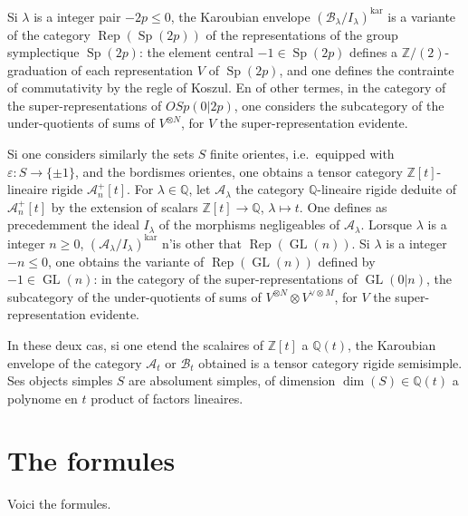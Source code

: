 \documentclass[11pt,a4paper]{article}
\DeclareMathOperator{\Rep}{Rep}
\DeclareMathOperator{\GL}{GL}
\DeclareMathOperator{\Sp}{Sp}
\newcommand{\Q}{\mathbb{Q}}
\newcommand{\Z}{\mathbb{Z}}
\begin{document}
Si $\lambda$ is a integer pair $-2p \leq 0$, the Karoubian envelope $(\mathcal{B}_\lambda/I_\lambda)^{\text{kar}}$ is a variante of the category $\Rep(\Sp(2p))$ of the representations of the group symplectique $\Sp(2p)$: the element central $-1 \in \Sp(2p)$ defines a $\Z/(2)$-graduation of each representation $V$ of $\Sp(2p)$, and one defines the contrainte of commutativity by the regle of Koszul. En of other termes, in the category of the super-representations of $OSp(0|2p)$, one considers the subcategory of the under-quotients of sums of $V^{\otimes N}$, for $V$ the super-representation evidente.

Si one considers similarly the sets $S$ finite orientes, i.e.~equipped with $\varepsilon: S \to \{\pm 1\}$, and the bordismes orientes, one obtains a tensor category $\Z[t]$-lineaire rigide $\mathcal{A}_n^+[t]$. For $\lambda \in \Q$, let $\mathcal{A}_\lambda$ the category $\Q$-lineaire rigide deduite of $\mathcal{A}_n^+[t]$ by the extension of scalars $\Z[t] \to \Q$, $\lambda \mapsto t$. One defines as precedemment the ideal $I_\lambda$ of the morphisms negligeables of $\mathcal{A}_\lambda$. Lorsque $\lambda$ is a integer $n \geq 0$, $(\mathcal{A}_\lambda/I_\lambda)^{\text{kar}}$ n'is other that $\Rep(\GL(n))$. Si $\lambda$ is a integer $-n \leq 0$, one obtains the variante of $\Rep(\GL(n))$ defined by $-1 \in \GL(n)$: in the category of the super-representations of $\GL(0|n)$, the subcategory of the under-quotients of sums of $V^{\otimes N} \otimes V^{\vee \otimes M}$, for $V$ the super-representation evidente.

In these deux cas, si one etend the scalaires of $\Z[t]$ a $\Q(t)$, the Karoubian envelope of the category $\mathcal{A}_t$ or $\mathcal{B}_t$ obtained is a tensor category rigide semisimple. Ses objects simples $S$ are absolument simples, of dimension $\dim(S) \in \Q(t)$ a polynome en $t$ product of factors lineaires.

\section*{The formules}

Voici the formules.
\end{document}
